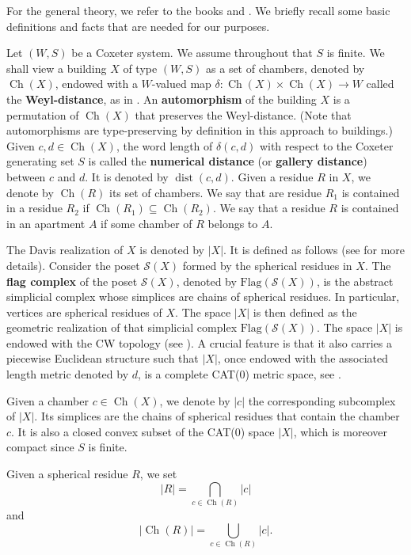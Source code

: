 \documentclass[12pt,a4paper]{amsproc}
\theoremstyle{definition}
\DeclareMathOperator{\Ch}{Ch}
\DeclareMathOperator{\dist}{dist}
\begin{document}
For the general theory, we refer to the books \cite{AbramenkoBrown} and \cite{Davis}. We briefly recall some  basic definitions and facts that are needed for our purposes. 

Let $(W,S)$ be a Coxeter system. We assume throughout that $S$ is finite. We shall view a building $X$ of type $(W, S)$ as a set of chambers, denoted by $\Ch(X)$, endowed with a $W$-valued map $\delta \colon \Ch(X) \times \Ch(X) \to W$ called the \textbf{Weyl-distance}, as in \cite[Chapter~5]{AbramenkoBrown}. An \textbf{automorphism} of the building $X$ is a permutation of $\Ch(X)$ that preserves the Weyl-distance. (Note that automorphisms are  type-preserving by definition in this approach to buildings.) Given $c, d \in \Ch(X)$, the word length of $\delta(c, d)$ with respect to the Coxeter generating set $S$ is called the \textbf{numerical distance} (or \textbf{gallery distance}) between $c$ and $d$. It is denoted by $\dist(c, d)$. Given a residue $R$ in $X$, we denote by $\Ch(R)$ its set of chambers. We say that are residue $R_1$ is contained in a residue $R_2$ if $\Ch(R_1) \subseteq \Ch(R_2)$. We say that a residue $R$ is contained in an apartment $A$ if some chamber of $R$ belongs to $A$.

The Davis realization of $X$  is denoted by $|X|$. It is defined  as follows (see \cite[\S18]{Davis} for more details). Consider  the poset $\mathcal S(X)$ formed by the spherical residues in $X$. The \textbf{flag complex} of the poset $\mathcal S(X)$, denoted by $\mathrm{Flag}(\mathcal S(X))$, is the abstract simplicial complex whose simplices are chains of spherical residues. In particular, vertices are spherical residues of $X$. The space $|X|$ is then defined as the geometric realization of that simplicial complex $\mathrm{Flag}(\mathcal S(X))$. The space $|X|$ is endowed with the CW topology (see \cite[\S A.1]{Davis}). A crucial feature is that it also carries a piecewise Euclidean structure such that $|X|$, once endowed with  the associated length metric denoted by $d$,    is  a complete  CAT($0$) metric space, see \cite[Theorem~18.3.1]{Davis}.  

Given a chamber $c \in \Ch(X)$, we denote by $|c|$ the corresponding subcomplex of $|X|$. Its simplices are the chains of spherical residues that contain the chamber $c$. It is also a  closed convex subset of the CAT($0$) space $|X|$, which is moreover compact since $S$ is finite. 

Given a spherical residue $R$, we set 
$$|R| = \bigcap_{c \in \Ch(R)} |c|$$
and
$$|\Ch(R)| = \bigcup_{c \in \Ch(R)} |c|.$$
\end{document}
